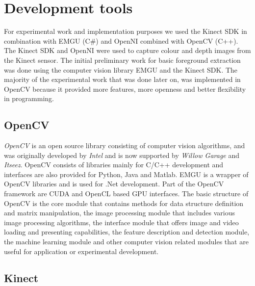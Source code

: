 \chapter{Development tools}
\label{sec:development-tools}

For experimental work and implementation purposes we used the Kinect SDK in combination with EMGU (C\#) and OpenNI combined with OpenCV (C++). The Kinect SDK and OpenNI were used to capture colour and depth images from the Kinect sensor. The initial preliminary work for basic foreground extraction was done using the computer vision library EMGU and the Kinect SDK. The majority of the experimental work that was done later on, was implemented in OpenCV because it provided more features, more openness and better flexibility in programming.

\section{OpenCV}
\label{sec:opencv}

\textit{OpenCV} is an open source library consisting of computer vision algorithms, and was originally developed by \textit{Intel} and is now supported by \textit{Willow Garage} and \textit{Itseez}. OpenCV consists of libraries mainly for C/C++ development and interfaces are also provided for Python, Java and Matlab. EMGU is a wrapper of OpenCV libraries and is used for .Net development. Part of the OpenCV framework are CUDA and OpenCL based GPU interfaces. The basic structure of OpenCV is the core module that contains methods for data structure definition and matrix manipulation, the image processing module that includes various image processing algorithms, the interface module that offers image and video loading and presenting capabilities, the feature description and detection module, the machine learning module and other computer vision related modules that are useful for application or experimental development.

\section{Kinect}
\label{sec:kinect}

